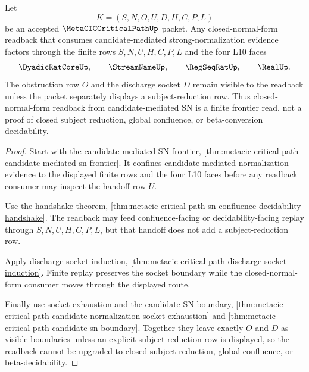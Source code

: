 \begin{theorem}
\label{thm:metacic-critical-path-candidate-mediated-sn-closed-normal-form-readback}
Let
$$
K=(S,N,O,U,D,H,C,P,L)
$$
be an accepted $\MetaCICCriticalPathUp$ packet. Any closed-normal-form readback that consumes candidate-mediated strong-normalization evidence factors through the finite rows $S,N,U,H,C,P,L$ and the four L10 faces
$$
\DyadicRatCoreUp,\qquad
\StreamNameUp,\qquad
\RegSeqRatUp,\qquad
\RealUp .
$$
The obstruction row $O$ and the discharge socket $D$ remain visible to the readback unless the packet separately displays a subject-reduction row. Thus closed-normal-form readback from candidate-mediated SN is a finite frontier read, not a proof of closed subject reduction, global confluence, or beta-conversion decidability.
\end{theorem}
\begin{proof}
Start with the candidate-mediated SN frontier, \autoref{thm:metacic-critical-path-candidate-mediated-sn-frontier}. It confines candidate-mediated normalization evidence to the displayed finite rows and the four L10 faces before any readback consumer may inspect the handoff row $U$.

Use the handshake theorem, \autoref{thm:metacic-critical-path-sn-confluence-decidability-handshake}. The readback may feed confluence-facing or decidability-facing replay through $S,N,U,H,C,P,L$, but that handoff does not add a subject-reduction row.

Apply discharge-socket induction, \autoref{thm:metacic-critical-path-discharge-socket-induction}. Finite replay preserves the socket boundary while the closed-normal-form consumer moves through the displayed route.

Finally use socket exhaustion and the candidate SN boundary, \autoref{thm:metacic-critical-path-candidate-normalization-socket-exhaustion} and \autoref{thm:metacic-critical-path-candidate-sn-boundary}. Together they leave exactly $O$ and $D$ as visible boundaries unless an explicit subject-reduction row is displayed, so the readback cannot be upgraded to closed subject reduction, global confluence, or beta-decidability.
\end{proof}

